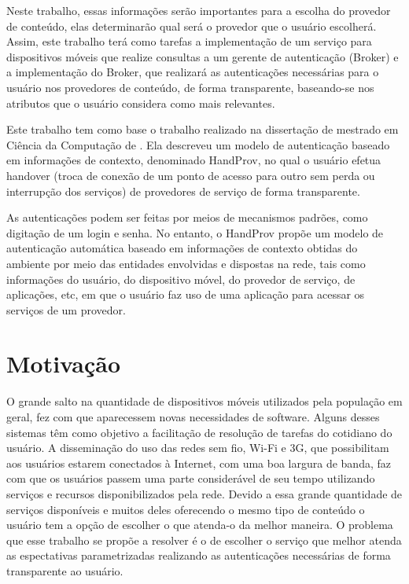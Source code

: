 Neste trabalho, essas informações serão importantes para a escolha do provedor de conteúdo, elas determinarão qual será o provedor que o usuário escolherá. Assim, este trabalho terá como tarefas a implementação de um serviço para dispositivos móveis que realize consultas a um gerente de autenticação (Broker) e a implementação do Broker, que realizará as autenticações necessárias para o usuário nos provedores de conteúdo, de forma transparente, baseando-se nos atributos que o usuário considera como mais relevantes.

Este trabalho tem como base o trabalho realizado na dissertação de mestrado em Ciência da Computação de \cite{praca12}. Ela descreveu um modelo de autenticação baseado em informações de contexto, denominado HandProv, no qual o usuário efetua handover (troca de conexão de um ponto de acesso para outro sem perda ou interrupção dos serviços) de provedores de serviço de forma transparente.

\begin{citacao}
As autenticações podem ser feitas por meios de mecanismos padrões, como digitação de um login e senha. No entanto, o HandProv propõe um modelo de autenticação automática baseado em informações de contexto obtidas do ambiente por meio das entidades envolvidas e dispostas na rede, tais como informações do usuário, do dispositivo móvel, do provedor de serviço, de aplicações, etc, em que o usuário faz uso de uma aplicação para acessar os serviços de um provedor. \cite{praca12}
\end{citacao}

\section{Motivação}
O grande salto na quantidade de dispositivos móveis utilizados pela população em geral, fez com que aparecessem novas necessidades de software. Alguns desses sistemas têm como objetivo a facilitação de resolução de tarefas do cotidiano do usuário.
A disseminação do uso das redes sem fio, Wi-Fi e 3G, que possibilitam aos usuários estarem conectados à Internet, com uma boa largura de banda, faz com que os usuários passem uma parte considerável de seu tempo utilizando serviços e recursos disponibilizados pela rede.
Devido a essa grande quantidade de serviços disponíveis e muitos deles oferecendo o mesmo tipo de conteúdo o usuário tem a opção de escolher o que atenda-o da melhor maneira.
O problema que esse trabalho se propõe a resolver é o de escolher o serviço que melhor atenda as espectativas parametrizadas realizando as autenticações necessárias de forma transparente ao usuário.

